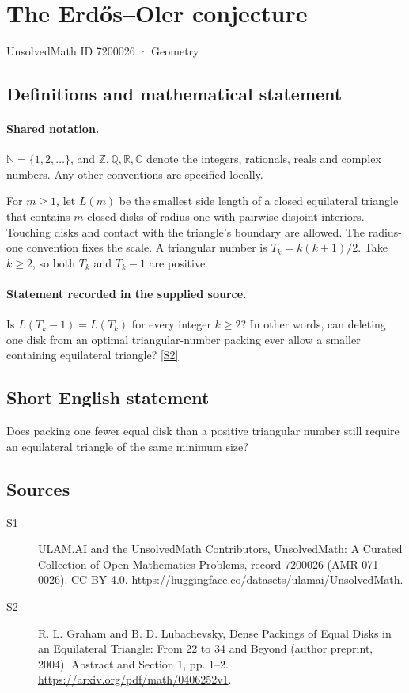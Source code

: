 \documentclass[11pt]{article}
\newcommand{\sref}[2]{\hyperlink{source:#1:#2}{[S#2]}}
\begin{document}
\setcounter{section}{7200025}
\section{The Erdős–Oler conjecture}\label{7200026}
{\small\sffamily UnsolvedMath ID 7200026 · Geometry}
\subsection{Definitions and mathematical statement}

\paragraph{Shared notation.}$\mathbb N=\{1,2,\ldots\}$, and $\mathbb Z,\mathbb Q,\mathbb R,\mathbb C$ denote the integers, rationals, reals and complex numbers. Any other conventions are specified locally.


For $m\geq1$, let $L(m)$ be the smallest side length of a closed equilateral triangle that contains $m$ closed disks of radius one with pairwise disjoint interiors. Touching disks and contact with the triangle's boundary are allowed. The radius-one convention fixes the scale. A triangular number is $T_k=k(k+1)/2$. Take $k\geq2$, so both $T_k$ and $T_k-1$ are positive.
\paragraph{Statement recorded in the supplied source.}
Is $L(T_k-1)=L(T_k)$ for every integer $k\geq2$? In other words, can deleting one disk from an optimal triangular-number packing ever allow a smaller containing equilateral triangle? \sref{7200026}{2}
\subsection{Short English statement}
Does packing one fewer equal disk than a positive triangular number still require an equilateral triangle of the same minimum size?
\subsection{Sources}
\begin{description}
\item[\hypertarget{source:7200026:1}{S1}] ULAM.AI and the UnsolvedMath Contributors, UnsolvedMath: A Curated Collection of Open Mathematics Problems, record 7200026 (AMR-071-0026). CC BY 4.0. \url{https://huggingface.co/datasets/ulamai/UnsolvedMath}.
\item[\hypertarget{source:7200026:2}{S2}] R. L. Graham and B. D. Lubachevsky, Dense Packings of Equal Disks in an Equilateral Triangle: From 22 to 34 and Beyond (author preprint, 2004). Abstract and Section 1, pp. 1–2. \url{https://arxiv.org/pdf/math/0406252v1}.
\end{description}
\label{end:7200026}
\end{document}
